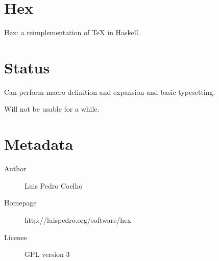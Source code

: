 \documentclass{article}
\begin{document}
\section{Hex}

Hex: a reimplementation of \TeX{} in Haskell.

\section{Status}

Can perform macro definition and expansion and basic typesetting.

Will not be usable for a while.

\section{Metadata}

\begin{description}
\item[Author] Luis Pedro Coelho
\item[Homepage] http://luispedro.org/software/hex
\item[License] GPL version 3
\end{description}
\end{document}
